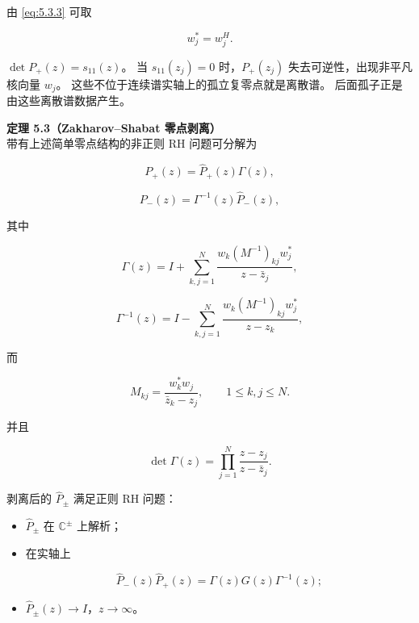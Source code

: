 \documentclass[
    lang=cn,
    scheme=chinese,
    mode=simple,
    device=normal,
    color=blue,
    math=cm,
    thmcnt=section,
    12pt,
    nowatermark
]{elegantbook}
\begin{document}
由 \eqref{eq:5.3.3} 可取

\begin{equation}
    w_j^*=w_j^H.
    \tag{5.3.13}
    \label{eq:5.3.13}
\end{equation}

\begin{callout}
    $\det P_+(z)=s_{11}(z)$。
    当 $s_{11}(z_j)=0$ 时，$P_+(z_j)$ 失去可逆性，出现非平凡核向量 $w_j$。
    这些不位于连续谱实轴上的孤立复零点就是离散谱。
    后面孤子正是由这些离散谱数据产生。
\end{callout}

\textbf{定理 5.3（Zakharov--Shabat 零点剥离）}\\
带有上述简单零点结构的非正则 RH 问题可分解为

\begin{equation}
    P_+(z)
    =
    \widehat P_+(z)\Gamma(z),
    \tag{5.3.14}
    \label{eq:5.3.14}
\end{equation}

\begin{equation}
    P_-(z)
    =
    \Gamma^{-1}(z)\widehat P_-(z),
    \tag{5.3.15}
    \label{eq:5.3.15}
\end{equation}

其中

\begin{equation}
    \Gamma(z)
    =
    I+
    \sum\limits_{k,j=1}^{N}
    \dfrac{
        w_k(M^{-1})_{kj}w_j^*
    }{
        z-\bar z_j
    },
    \tag{5.3.16}
    \label{eq:5.3.16}
\end{equation}

\begin{equation}
    \Gamma^{-1}(z)
    =
    I-
    \sum\limits_{k,j=1}^{N}
    \dfrac{
        w_k(M^{-1})_{kj}w_j^*
    }{
        z-z_k
    },
    \tag{5.3.17}
    \label{eq:5.3.17}
\end{equation}

而

\[
    M_{kj}
    =
    \dfrac{w_k^*w_j}{\bar z_k-z_j},
    \qquad
    1\le k,j\le N.
\]

并且

\[
    \det\Gamma(z)
    =
    \prod\limits_{j=1}^{N}
    \dfrac{z-z_j}{z-\bar z_j}.
\]

剥离后的 $\widehat P_\pm$ 满足正则 RH 问题：

\begin{itemize}
    \item $\widehat P_\pm$ 在 $\mathbb{C}^\pm$ 上解析；
    \item 在实轴上

          \[
              \widehat P_-(z)\widehat P_+(z)
              =
              \Gamma(z)G(z)\Gamma^{-1}(z);
          \]

    \item $\widehat P_\pm(z)\to I$，$z\to\infty$。
\end{itemize}
\end{document}
